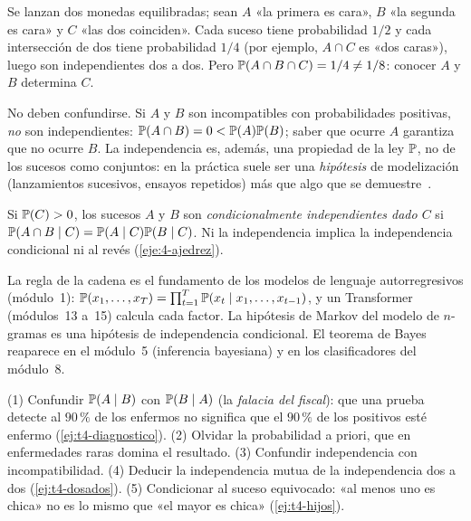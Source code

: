 \begin{ejemplo}\label{ej:t4-dosados}
Se lanzan dos monedas equilibradas; sean $A$ «la primera es cara», $B$ «la segunda es cara» y $C$ «las dos coinciden». Cada suceso tiene probabilidad $1/2$ y cada intersección de dos tiene probabilidad $1/4$ (por ejemplo, $A\cap C$ es «dos caras»), luego son independientes dos a dos. Pero $\mathbb{P}(A\cap B\cap C)=1/4\neq1/8$: conocer $A$ y $B$ determina $C$.
\end{ejemplo}

\begin{observacion}
No deben confundirse. Si $A$ y $B$ son incompatibles con probabilidades positivas, \emph{no} son independientes: $\mathbb{P}(A\cap B)=0<\mathbb{P}(A)\mathbb{P}(B)$; saber que ocurre $A$ garantiza que no ocurre $B$. La independencia es, además, una propiedad de la ley $\mathbb{P}$, no de los sucesos como conjuntos: en la práctica suele ser una \emph{hipótesis} de modelización (lanzamientos sucesivos, ensayos repetidos) más que algo que se demuestre~\cite[§17.7.2]{mcs}.
\end{observacion}

Si $\mathbb{P}(C)>0$, los sucesos $A$ y $B$ son \emph{condicionalmente independientes dado $C$} si $\mathbb{P}(A\cap B\mid C)=\mathbb{P}(A\mid C)\mathbb{P}(B\mid C)$. Ni la independencia implica la independencia condicional ni al revés (\cref{eje:4-ajedrez}).

\begin{observacion}
La regla de la cadena es el fundamento de los modelos de lenguaje autorregresivos (módulo~1): $\mathbb{P}(x_1,\dots,x_T)=\prod_{t=1}^{T}\mathbb{P}(x_t\mid x_1,\dots,x_{t-1})$, y un Transformer (módulos~13 a~15) calcula cada factor. La hipótesis de Markov del modelo de $n$-gramas es una hipótesis de independencia condicional. El teorema de Bayes reaparece en el módulo~5 (inferencia bayesiana) y en los clasificadores del módulo~8.
\end{observacion}

\begin{observacion}
(1) Confundir $\mathbb{P}(A\mid B)$ con $\mathbb{P}(B\mid A)$ (la \emph{falacia del fiscal}): que una prueba detecte al $90\,\%$ de los enfermos no significa que el $90\,\%$ de los positivos esté enfermo (\cref{ej:t4-diagnostico}). (2) Olvidar la probabilidad a priori, que en enfermedades raras domina el resultado. (3) Confundir independencia con incompatibilidad. (4) Deducir la independencia mutua de la independencia dos a dos (\cref{ej:t4-dosados}). (5) Condicionar al suceso equivocado: «al menos uno es chica» no es lo mismo que «el mayor es chica» (\cref{ej:t4-hijos}).
\end{observacion}

